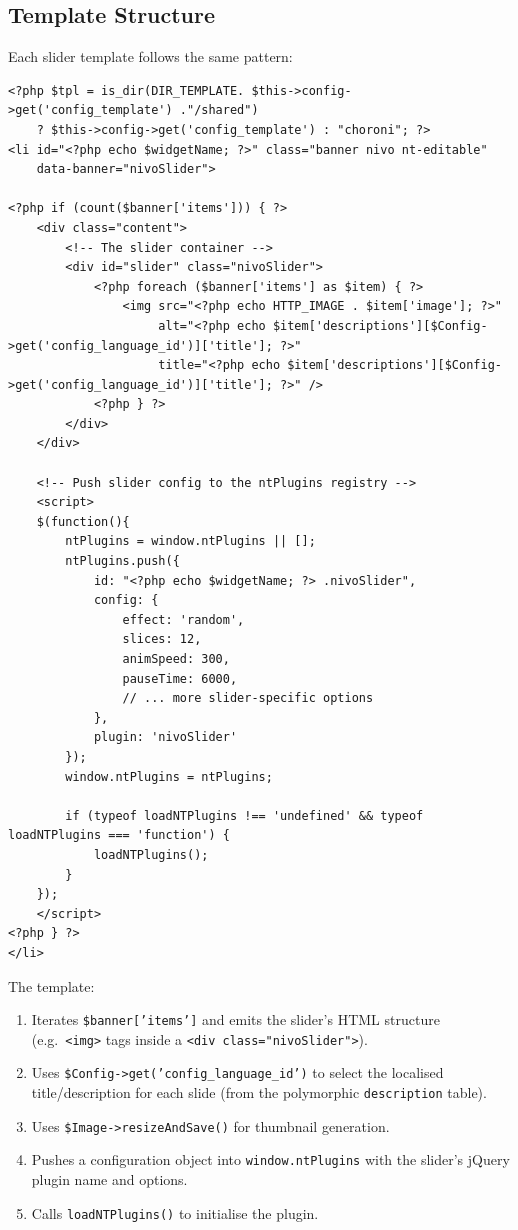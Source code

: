 \documentclass[11pt,a4paper]{article}
\begin{document}
\subsection{Template Structure}

Each slider template follows the same pattern:

\begin{lstlisting}[caption={The universal slider template pattern (abridged from \texttt{nivo-slider.tpl}).},label={lst:slider-pattern}]
<?php $tpl = is_dir(DIR_TEMPLATE. $this->config->get('config_template') ."/shared")
    ? $this->config->get('config_template') : "choroni"; ?>
<li id="<?php echo $widgetName; ?>" class="banner nivo nt-editable"
    data-banner="nivoSlider">

<?php if (count($banner['items'])) { ?>
    <div class="content">
        <!-- The slider container -->
        <div id="slider" class="nivoSlider">
            <?php foreach ($banner['items'] as $item) { ?>
                <img src="<?php echo HTTP_IMAGE . $item['image']; ?>"
                     alt="<?php echo $item['descriptions'][$Config->get('config_language_id')]['title']; ?>"
                     title="<?php echo $item['descriptions'][$Config->get('config_language_id')]['title']; ?>" />
            <?php } ?>
        </div>
    </div>

    <!-- Push slider config to the ntPlugins registry -->
    <script>
    $(function(){
        ntPlugins = window.ntPlugins || [];
        ntPlugins.push({
            id: "<?php echo $widgetName; ?> .nivoSlider",
            config: {
                effect: 'random',
                slices: 12,
                animSpeed: 300,
                pauseTime: 6000,
                // ... more slider-specific options
            },
            plugin: 'nivoSlider'
        });
        window.ntPlugins = ntPlugins;

        if (typeof loadNTPlugins !== 'undefined' && typeof loadNTPlugins === 'function') {
            loadNTPlugins();
        }
    });
    </script>
<?php } ?>
</li>
\end{lstlisting}

The template:
\begin{enumerate}[leftmargin=1.6em,itemsep=2pt]
  \item Iterates \texttt{\$banner['items']} and emits the slider's
        HTML structure (e.g.\ \texttt{<img>} tags inside a
        \texttt{<div class="nivoSlider">}).
  \item Uses \texttt{\$Config->get('config\_language\_id')} to select
        the localised title/description for each slide (from the
        polymorphic \texttt{description} table).
  \item Uses \texttt{\$Image->resizeAndSave()} for thumbnail
        generation.
  \item Pushes a configuration object into
        \texttt{window.ntPlugins} with the slider's jQuery plugin name
        and options.
  \item Calls \texttt{loadNTPlugins()} to initialise the plugin.
\end{enumerate}
\end{document}
